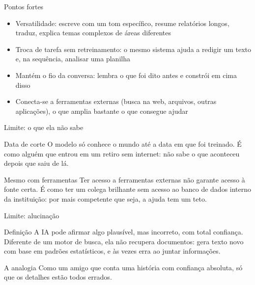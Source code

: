 \documentclass[aspectratio=169,11pt]{beamer}
\begin{document}
\begin{frame}{Pontos fortes}
  \begin{itemize}
    \item Versatilidade: escreve com um tom específico, resume relatórios longos, traduz, explica temas complexos de áreas diferentes
    \item Troca de tarefa sem retreinamento: o mesmo sistema ajuda a redigir um texto e, na sequência, analisar uma planilha
    \item Mantém o fio da conversa: lembra o que foi dito antes e constrói em cima disso
    \item Conecta-se a ferramentas externas (busca na web, arquivos, outras aplicações), o que amplia bastante o que consegue ajudar
  \end{itemize}
\end{frame}

\begin{frame}{Limite: o que ela não sabe}
  \begin{notebox}{Data de corte}
    \small O modelo só conhece o mundo até a data em que foi treinado. É como alguém que entrou em um retiro sem internet: não sabe o que aconteceu depois que saiu de lá.
  \end{notebox}
  \vspace{0.3cm}
  \begin{alertbox}{Mesmo com ferramentas}
    \small Ter acesso a ferramentas externas não garante acesso à fonte certa. É como ter um colega brilhante sem acesso ao banco de dados interno da instituição: por mais competente que seja, a ajuda tem um teto.
  \end{alertbox}
\end{frame}

\begin{frame}{Limite: alucinação}
  \begin{notebox}{Definição}
    \small A IA pode afirmar algo plausível, mas incorreto, com total confiança. Diferente de um motor de busca, ela não recupera documentos: gera texto novo com base em padrões estatísticos, e às vezes erra ao juntar informações.
  \end{notebox}
  \vspace{0.3cm}
  \begin{alertbox}{A analogia}
    \small Como um amigo que conta uma história com confiança absoluta, só que os detalhes estão todos errados.
  \end{alertbox}
\end{frame}
\end{document}
